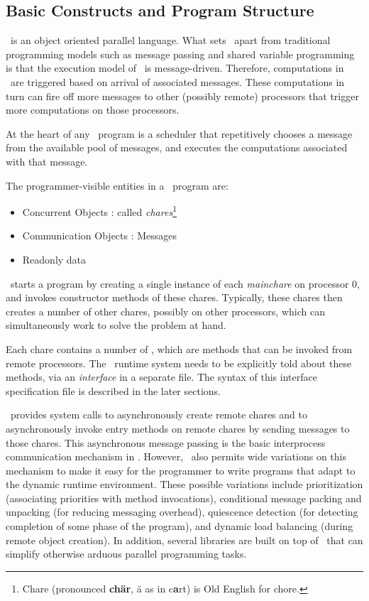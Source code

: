\subsection{Basic Constructs and Program Structure}

\charmpp\ is an object oriented parallel language. What sets \charmpp\ apart
from traditional programming models such as message passing and shared variable
programming is that the execution model of \charmpp\ is message-driven.
Therefore, computations in \charmpp\ are triggered based on arrival of
associated messages. These computations in turn can fire off more messages to
other (possibly remote) processors that trigger more computations on those
processors.

At the heart of any \charmpp\ program is a scheduler that repetitively chooses
a message from the available pool of messages, and executes the computations
associated with that message.

The programmer-visible entities in a \charmpp\ program are:

\begin{itemize}
\item Concurrent Objects : called {\em chares}\footnote{
      Chare (pronounced {\bf ch\"ar}, \"a as in c{\bf a}rt) is Old 
      English for chore.
      }
\item Communication Objects : Messages
\item Readonly data
\end{itemize}

\charmpp\ starts a program by creating a single  instance of each
{\em mainchare} on processor 0, and invokes constructor methods of these
chares.  Typically, these chares then creates a number of other 
chares, possibly on other processors, which can simultaneously work to solve
the problem at hand.

Each chare contains a number of , which are methods that can be invoked from remote processors. The
\charmpp\ runtime system needs to be explicitly told about these methods, via
an {\em interface} in a separate file.  The syntax of this interface
specification file is described in the later sections.

\charmpp\ provides system calls to asynchronously create remote 
chares and to asynchronously invoke entry methods on remote chares by sending
 messages to those chares. This asynchronous
message passing is the basic interprocess communication
mechanism in \charmpp. However, \charmpp\ also permits wide variations on this
mechanism to make it easy for the programmer to write programs that adapt to
the dynamic runtime environment.  These possible variations include
prioritization (associating priorities with method invocations), conditional
message packing and unpacking (for reducing messaging
overhead), quiescence detection (for detecting completion of
some phase of the program), and dynamic load balancing (during remote object
creation). In addition, several libraries are built on top of \charmpp\ that
can simplify otherwise arduous parallel programming tasks.

